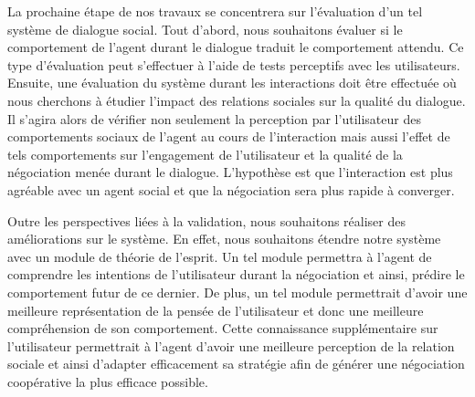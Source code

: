 \documentclass [french]{sig-alternate-05-2015}
\begin{document}
\par La prochaine étape de nos travaux se concentrera sur l'évaluation d'un tel système de dialogue social. Tout d'abord, nous souhaitons évaluer si le comportement de l'agent durant le dialogue traduit le comportement attendu. Ce type d'évaluation peut s'effectuer à l'aide de tests perceptifs avec les utilisateurs. 
Ensuite, une évaluation du système durant les interactions doit être effectuée où nous cherchons à étudier l'impact des relations sociales sur la qualité du dialogue. Il s'agira alors de vérifier non seulement la perception par l'utilisateur des comportements sociaux de l'agent au cours de l'interaction mais aussi l'effet de tels comportements sur l'engagement de l'utilisateur et la qualité de la négociation menée durant le dialogue. L'hypothèse est que l'interaction est plus agréable avec un agent social et que la négociation sera plus rapide à converger.

\par Outre les perspectives liées à la validation, nous souhaitons réaliser des améliorations sur le système. En effet, nous souhaitons étendre notre système avec un module de théorie de l'esprit. Un tel module permettra à l'agent de comprendre les intentions de l'utilisateur durant la négociation et ainsi, prédire le comportement futur de ce dernier.  De plus, un tel module permettrait d'avoir une meilleure  représentation de la pensée de l'utilisateur et donc une meilleure compréhension de son comportement. Cette connaissance supplémentaire sur l'utilisateur permettrait à l'agent d'avoir une meilleure perception de la relation sociale et ainsi d'adapter efficacement sa stratégie afin de générer une négociation coopérative la plus efficace possible.
\vskip 5pt


\end{document}
